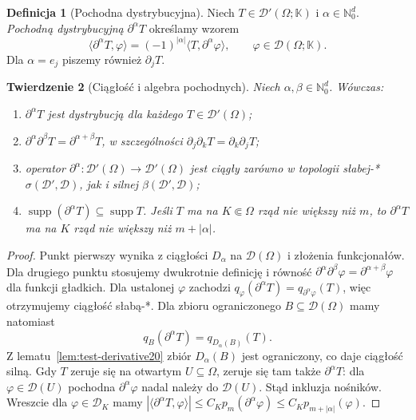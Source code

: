 \documentclass[11pt,a4paper]{article}
\numberwithin{equation}{section}
\theoremstyle{plain}
\newtheorem{twierdzenie}{Twierdzenie}[section]
\theoremstyle{definition}
\newtheorem{definicja}[twierdzenie]{Definicja}
\theoremstyle{remark}
\newcommand{\N}{\mathbb N}
\newcommand{\K}{\mathbb K}
\DeclareMathOperator{\supp}{supp}
\begin{document}
\begin{definicja}[Pochodna dystrybucyjna]
\label{def:dist-deriv20}
Niech $T\in\mathcal D'(\Omega;\K)$ i $\alpha\in\N_0^d$.
\emph{Pochodną dystrybucyjną} $\partial^\alpha T$ określamy wzorem
\[
 \langle\partial^\alpha T,\varphi\rangle
 =(-1)^{|\alpha|}\langle T,\partial^\alpha\varphi\rangle,
 \qquad\varphi\in\mathcal D(\Omega;\K).
\]
Dla $\alpha=e_j$ piszemy również $\partial_jT$.
\end{definicja}

\begin{twierdzenie}[Ciągłość i algebra pochodnych]
\label{thm:dist-deriv-cont20}
Niech $\alpha,\beta\in\N_0^d$. Wówczas:
\begin{enumerate}
\item $\partial^\alpha T$ jest dystrybucją dla każdego
$T\in\mathcal D'(\Omega)$;
\item $\partial^\alpha\partial^\beta T
=\partial^{\alpha+\beta}T$, w szczególności
$\partial_j\partial_kT=\partial_k\partial_jT$;
\item operator $\partial^\alpha:\mathcal D'(\Omega)\to
\mathcal D'(\Omega)$ jest ciągły zarówno w topologii słabej-*
$\sigma(\mathcal D',\mathcal D)$, jak i silnej
$\beta(\mathcal D',\mathcal D)$;
\item $\supp(\partial^\alpha T)\subseteq\supp T$.
Jeśli $T$ ma na $K\Subset\Omega$ rząd nie większy niż $m$,
to $\partial^\alpha T$ ma na $K$ rząd nie większy niż
$m+|\alpha|$.
\end{enumerate}
\end{twierdzenie}
\begin{proof}
Punkt pierwszy wynika z ciągłości $D_\alpha$ na
$\mathcal D(\Omega)$ i złożenia funkcjonałów.
Dla drugiego punktu stosujemy dwukrotnie definicję i równość
$\partial^\alpha\partial^\beta\varphi
=\partial^{\alpha+\beta}\varphi$ dla funkcji gładkich.
Dla ustalonej $\varphi$ zachodzi
$q_\varphi(\partial^\alpha T)=q_{\partial^\alpha\varphi}(T)$,
więc otrzymujemy ciągłość słabą-*.
Dla zbioru ograniczonego $B\subseteq\mathcal D(\Omega)$
mamy natomiast
\[
 q_B(\partial^\alpha T)=q_{D_\alpha(B)}(T).
\]
Z lematu~\ref{lem:test-derivative20} zbiór $D_\alpha(B)$ jest
ograniczony, co daje ciągłość silną. Gdy $T$ zeruje się na
otwartym $U\subseteq\Omega$, zeruje się tam także $\partial^\alpha T$:
dla $\varphi\in\mathcal D(U)$ pochodna $\partial^\alpha\varphi$
nadal należy do $\mathcal D(U)$. Stąd inkluzja nośników.
Wreszcie dla $\varphi\in\mathcal D_K$ mamy
$|\langle\partial^\alpha T,\varphi\rangle|
\le C_Kp_m(\partial^\alpha\varphi)
\le C_Kp_{m+|\alpha|}(\varphi)$.
\end{proof}
\end{document}
